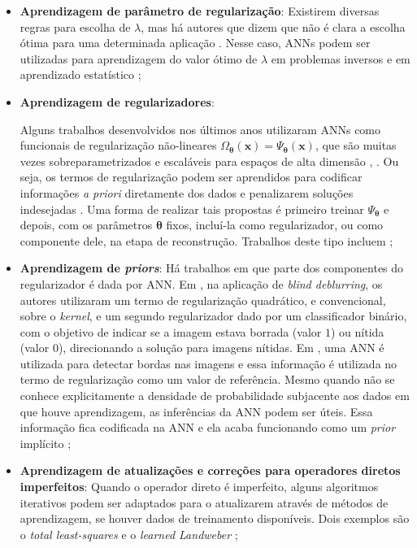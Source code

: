 \begin{itemize}
\item \textbf{Aprendizagem de parâmetro de regularização}: Existirem diversas regras para escolha de $\lambda$, mas há autores que dizem que não é clara a escolha ótima para uma determinada aplicação \cite{Afkham2021}. Nesse caso, ANNs podem ser utilizadas para aprendizagem do valor ótimo de $\lambda$ em problemas inversos \cite{Afkham2021} e em aprendizado estatístico \cite{deVito2020};


\item \textbf{Aprendizagem de regularizadores}: 


Alguns trabalhos desenvolvidos nos últimos anos utilizaram ANNs como funcionais de regularização não-lineares $\Omega_{\bm{\theta}}(\mathbf{x}) = \Psi_{\bm{\theta}}(\mathbf{x})$, que são muitas vezes sobreparametrizados e escaláveis para espaços de alta dimensão \cite[Subseção 4.7]{Arridge2019}, \cite{Liu2020, Lunz2018, Ongie2020}. Ou seja, os termos de regularização podem ser aprendidos para codificar informações \textit{a priori} diretamente dos dados e penalizarem soluções indesejadas \cite[págs. 62-6]{Arridge2019}. Uma forma de realizar tais propostas é primeiro treinar $\Psi_{\bm{\theta}}$ e depois, com os parâmetros $\bm{\theta}$ fixos, incluí-la como regularizador, ou como componente dele, na etapa de reconstrução. Trabalhos deste tipo incluem \cite{Bobin2021, Fang2020, Kobler2020, Li2019, Li_2020, Lunz2018,  Obmann_2021, Wu2017, Wu2021};


\item \textbf{Aprendizagem de \textit{priors}}: Há trabalhos em que parte dos componentes do regularizador é dada por ANN. Em \cite{Li2019}, na aplicação de \textit{blind deblurring}, os autores utilizaram um termo de regularização quadrático, e convencional, sobre o \textit{kernel}, e um segundo regularizador dado por um classificador binário, com o objetivo de indicar se a imagem estava borrada (valor $1$) ou nítida (valor $0$), direcionando a solução para imagens nítidas.   Em  \cite{Fang2020}, uma ANN é utilizada para detectar bordas nas imagens e essa informação é utilizada no termo de regularização como um valor de referência. Mesmo quando não se conhece explicitamente a densidade de probabilidade subjacente aos dados em que houve aprendizagem, as inferências da ANN podem ser úteis. Essa informação fica codificada na ANN e ela acaba funcionando como um \textit{prior} implícito \cite{kadkhodaie2021solving}; 

\item \textbf{Aprendizagem de atualizações e correções para operadores diretos imperfeitos}: Quando o operador direto é imperfeito, alguns algoritmos iterativos podem ser adaptados para o atualizarem através de métodos de aprendizagem, se houver dados de treinamento disponíveis. Dois exemplos são o \textit{total least-squares} e o \textit{learned Landweber} \cite[págs. 106-9]{Arridge2019};




\end{itemize}
